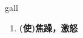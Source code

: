 
\begin{frame}
{\huge gall}
\begin{center}
\begin{enumerate}\Large
  \item \textbf{(使)焦躁，激怒}
\end{enumerate}
\end{center}
\end{frame}
